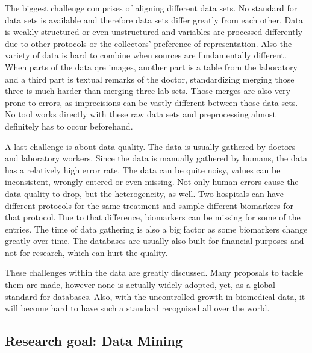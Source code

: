 \documentclass[10pt,a4paper]{article}
\begin{document}
	The biggest challenge comprises of aligning different data sets. No standard for data sets is available and therefore data sets differ greatly from each other. Data is weakly structured or even unstructured\cite{Holzinger2014} and variables are processed differently due to other protocols or the collectors' preference of representation\cite{Otasek2014}. Also the variety of data is hard to combine when sources are fundamentally different. When parts of the data qre images, another part is a table from the laboratory and a third part is textual remarks of the doctor, standardizing merging those three is much harder than merging three lab sets. Those merges are also very prone to errors, as imprecisions can be vastly different between those data sets. No tool works directly with these raw data sets and preprocessing almost definitely has to occur beforehand\cite{CIOS20021, Turkay2014}.
	
	A last challenge is about data quality. The data is usually gathered by doctors and laboratory workers. Since the data is manually gathered by humans, the data has a relatively high error rate. The data can be quite noisy, values can be inconsistent, wrongly entered or even missing.\cite{CIOS20021} Not only human errors cause the data quality to drop, but the heterogeneity, as well. Two hospitals can have different protocols for the same treatment and sample different biomarkers for that protocol. Due to that difference, biomarkers can be missing for some of the entries. The time of data gathering is also a big factor as some biomarkers change greatly over time. The databases are usually also built for financial purposes and not for research, which can hurt the quality.\cite{Yoo2012}
	
	These challenges within the data are greatly discussed.\cite{bellazzi2011data} Many proposals to tackle them are made, however none is actually widely adopted, yet, as a global standard for databases. Also, with the uncontrolled growth in biomedical data, it will become hard to have such a standard recognised all over the world.\cite{Otasek2014, marenco2004qis, bichutskiy2006heterogeneous, sperzel1991biomedical, aubry1988design, Windridge2014}  
	
	\subsection{Research goal: Data Mining}
	\label{subsec:ResearchTarget}
	
\end{document}
